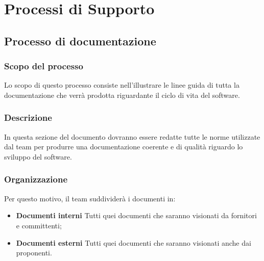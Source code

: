 \newpage
\section{Processi di Supporto}
\subsection{Processo di documentazione}
\subsubsection{Scopo del processo}
Lo scopo di questo processo consiste nell'illustrare le linee guida di tutta la documentazione che verrà prodotta riguardante il ciclo di vita del software.
\subsubsection{Descrizione}
In questa sezione del documento dovranno essere redatte tutte le norme utilizzate dal team per produrre una documentazione coerente e di qualità riguardo lo sviluppo del software.
\subsubsection{Organizzazione}
Per questo motivo, il team suddividerà i documenti in:
\begin{itemize}
	\item \textbf{Documenti interni}
	\newline Tutti quei documenti che saranno visionati da fornitori e committenti;
	\item \textbf{Documenti esterni}
	\newline Tutti quei documenti che saranno visionati anche dai proponenti.
	
\end{itemize}
	
